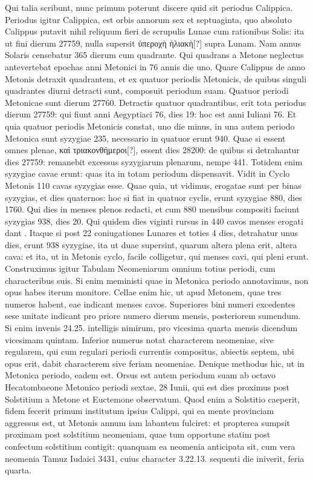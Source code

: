 Qui talia scribunt, nunc primum poterunt discere
 quid sit periodus
Calippica.
Periodus igitur Calippica, est orbis annorum sex et septuaginta,
quo absoluto Calippus putavit nihil reliquum fieri de scrupulis
Lunae cum rationibus Solis: ita ut fini dierum 27759, nulla supersit
\textgreek{ὑπεροχὴ ἡλιακὴ[?]} supra Lunam.
Nam annus Solaris censebatur 365 dierum
cum quadrante.
Qui quadrans a Metone neglectus antevertebat
epochas anni Metonici in 76 annis die uno.
Quare Calippus de anno
Metonis detraxit quadrantem, et ex quatuor periodis Metonicis,
de quibus singuli quadrantes diurni detracti sunt, composuit periodum
suam.
Quatuor periodi Metonicae sunt dierum 27760.
Detractis
quatuor quadrantibus, erit tota periodus dierum 27759: qui
fiunt anni Aegyptiaci 76, dies 19: hoc est anni Iuliani 76.
Et quia
quatuor periodis Metonicis constat, uno die minus, in una autem periodo
Metonica sunt syzygiae 235, necessario in quatuor erunt 940.
Quae si essent omnes plenae, \textgreek{καὶ τριακονθήμεροι[?]},
 essent dies 28200: de
quibus si detrahantur dies 27759: remanebit excessus syzygiarum
plenarum, nempe 441.
Totidem enim syzygiae cavae erunt: quas ita
in totam periodum dispensavit.
Vidit in Cyclo Metonis 110 cavas
syzygias esse.
Quae quia, ut vidimus, erogatae sunt per binas syzygias,
et dies quaternos: hoc si fiat in quatuor cyclis, erunt syzygiae
880, dies 1760.
Qui dies in menses plenos redacti, et cum 880 mensibus
compositi faciunt syzygias 938, dies 20.
Qui quidem dies viginti
rursus in 440 cavos menses erogati dant .
Itaque si post 22 coniugationes
Lunares et toties 4 dies, detrahatur unus dies, erunt 938
syzygiae, ita ut duae supersint, quarum altera plena erit, altera cava: et
ita, ut in Metonis cyclo, facile colligetur, qui menses cavi, qui pleni
erunt.
Construximus igitur Tabulam Neomeniarum omnium totius
periodi, cum characteribus suis.
Si enim meministi quae in Metonica
periodo annotavimus, non opus habes iterum monitore.
Cellae
enim hic, ut apud Metonem, quae tres numeros habent, eae indicant
menses cavos.
Superiores bini numeri excedentes sese unitate indicant
pro priore numero dierum mensis, posteriorem sumendum.
Si enim
invenis 24.25. intelligis nimirum, pro vicesima quarta mensis dicendum
vicesimam quintam.
Inferior numerus notat characterem neomeniae,
sive regularem, qui cum regulari periodi currentis compositus,
abiectis septem, ubi opus erit, dabit characterem sive feriam neomeniae.
Denique methodus hic, ut in Metonica periodo, eadem est.
Orsus est autem periodum suam ab octavo Hecatombaeone Metonico
periodi sextae, 28 Iunii, qui est dies proximus post Solstitium a
Metone et Euctemone observatum.
Quod enim a Solstitio caeperit,
fidem fecerit primum institutum ipsius Calippi, qui ea mente provinciam
aggressus est, ut Metonis annum iam labantem fulciret: et propterea
sumpsit proximam post solstitium neomeniam, quae tum opportune
statim post confectum solstitium contigit: quanquam ea neomenia
anticipata sit, cum vera neomenia Tamuz Iudaici 3431, cuius
character 3.22.13. sequenti die iniverit, feria quarta.

